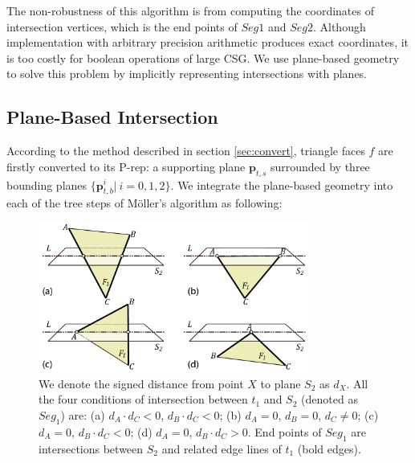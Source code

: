 \documentclass[10pt,journal,compsoc]{IEEEtran}
\begin{document}
The non-robustness of this algorithm is from computing the coordinates of intersection vertices, which is the end points of $Seg1$ and $Seg2$. Although implementation with arbitrary precision arithmetic produces exact coordinates, it is too costly for boolean operations of large CSG. We use plane-based geometry to solve this problem by implicitly representing intersections with planes.


\subsection{Plane-Based Intersection}

\label{sec:embed}
According to the method described in section \ref{sec:convert}, triangle faces $f$ are firstly converted to its P-rep: a supporting plane $\bm{p}_{t, s}$ surrounded by three bounding planes $\{\bm{p}_{t, b}^i|\ i = 0,1,2\}$. We integrate the plane-based geometry into each of the tree steps of M\"{o}ller's algorithm as following:

\begin{figure}[t]
\centering
\includegraphics[width=3.5in]{sign}
\caption{We denote the signed distance from point $X$ to plane $S_2$ as $d_X$. All the four conditions of intersection between $t_1$ and $S_2$ (denoted as $Seg_1$) are:  (a) $d_A\cdot d_C<0$, $d_B\cdot d_C<0$; (b) $d_A=0$, $d_B=0$, $d_C\neq 0$; (c) $d_A=0$, $d_B\cdot d_C<0$; (d) $d_A=0$, $d_B\cdot d_C>0$. End points of $Seg_1$ are intersections between $S_2$ and related edge lines of $t_1$ (bold edges).}
\label{fig:isect}
\end{figure}
\end{document}
